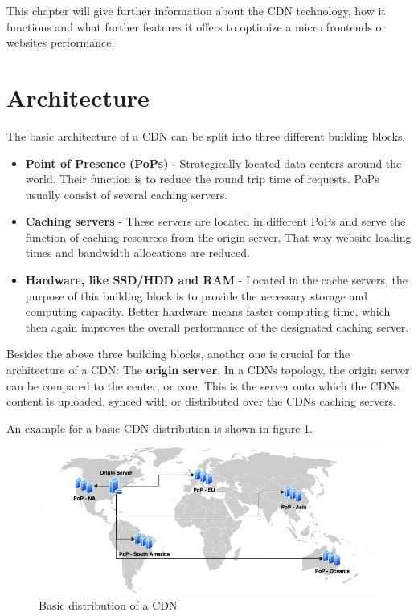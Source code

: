 This chapter will give further information about the CDN technology, how it functions and what further features it offers to optimize a micro frontends or websites performance.

\section{Architecture}

The basic architecture of a CDN can be split into three different building blocks.

\begin{itemize}
	\item \textbf{Point of Presence (PoPs)} - Strategically located data centers around the world. Their function is to reduce the round trip time of requests. PoPs usually consist of several caching servers.
	\item \textbf{Caching servers} - These servers are located in different PoPs and serve the function of caching resources from the origin server. That way website loading times and bandwidth allocations are reduced.
	\item \textbf{Hardware, like SSD/HDD and RAM} - Located in the cache servers, the purpose of this building block is to provide the necessary storage and computing capacity. Better hardware means faster computing time, which then again improves the overall performance of the designated caching server.
\end{itemize}

Besides the above three building blocks, another one is crucial for the architecture of a CDN: The \textbf{origin server}. In a CDNs topology, the origin server can be compared to the center, or core. This is the server onto which the CDNs content is uploaded, synced with or distributed over the CDNs caching servers.\cite{cdn_origin_server}

An example for a basic CDN distribution is shown in figure \ref{fig:cdn_general_arch}.

\begin{figure}[!h]
	\centering
	\includegraphics[width=1\textwidth]{Figures/basic_cdn_arch.drawio.png}
	\caption{Basic distribution of a CDN}
	\label{fig:cdn_general_arch}
\end{figure}


